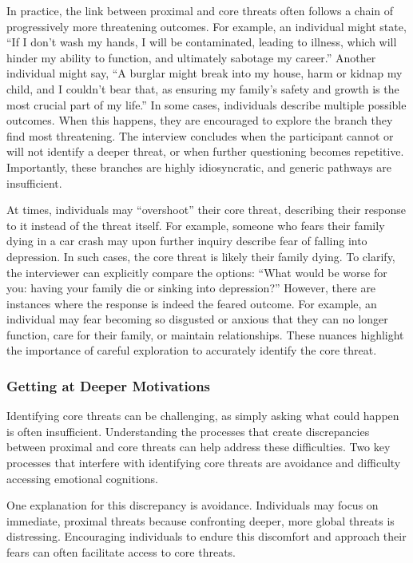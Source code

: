 \documentclass[
  man,floatsintext]{apa7}
\begin{document}
In practice, the link between proximal and core threats often follows a chain of progressively more threatening outcomes.
For example, an individual might state, ``If I don't wash my hands, I will be contaminated, leading to illness, which will hinder my ability to function, and ultimately sabotage my career.''
Another individual might say, ``A burglar might break into my house, harm or kidnap my child, and I couldn't bear that, as ensuring my family's safety and growth is the most crucial part of my life.''
In some cases, individuals describe multiple possible outcomes.
When this happens, they are encouraged to explore the branch they find most threatening.
The interview concludes when the participant cannot or will not identify a deeper threat, or when further questioning becomes repetitive.
Importantly, these branches are highly idiosyncratic, and generic pathways are insufficient.

At times, individuals may ``overshoot'' their core threat, describing their response to it instead of the threat itself.
For example, someone who fears their family dying in a car crash may upon further inquiry describe fear of falling into depression.
In such cases, the core threat is likely their family dying.
To clarify, the interviewer can explicitly compare the options: ``What would be worse for you: having your family die or sinking into depression?''
However, there are instances where the response is indeed the feared outcome.
For example, an individual may fear becoming so disgusted or anxious that they can no longer function, care for their family, or maintain relationships.
These nuances highlight the importance of careful exploration to accurately identify the core threat.

\subsubsection{Getting at Deeper Motivations}\label{getting-at-deeper-motivations}

Identifying core threats can be challenging, as simply asking what could happen is often insufficient.
Understanding the processes that create discrepancies between proximal and core threats can help address these difficulties.
Two key processes that interfere with identifying core threats are avoidance and difficulty accessing emotional cognitions.

One explanation for this discrepancy is avoidance.
Individuals may focus on immediate, proximal threats because confronting deeper, more global threats is distressing.
Encouraging individuals to endure this discomfort and approach their fears can often facilitate access to core threats.
\end{document}
